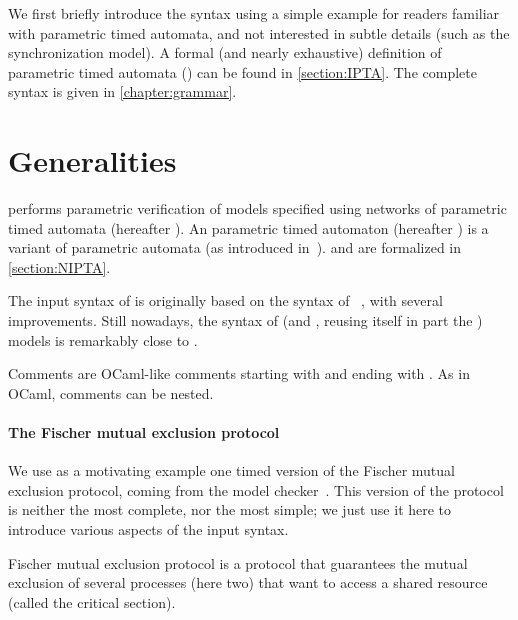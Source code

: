 We first briefly introduce the syntax using a simple example for readers familiar with parametric timed automata, and not interested in subtle details (such as the synchronization model).
A formal (and nearly exhaustive) definition of \imitator{} parametric timed automata (\NIPTA{}) can be found in \cref{section:IPTA}.
The complete syntax is given in \cref{chapter:grammar}.

\section{Generalities}
\imitator{} performs parametric verification of models specified using networks of \imitator{} parametric timed automata (hereafter \NIPTA{}).
An \imitator{} parametric timed automaton (hereafter \IPTA{}) is a variant of parametric automata (as introduced in~\cite{AHV93}).
\IPTA{} and \NIPTA{} are formalized in \cref{section:NIPTA}.

The input syntax of \imitator{} is originally based on the syntax of \hytech{}~\cite{HHW95}, with several improvements.
%
Still nowadays, the syntax of \hytech{} (and \phaverLite{}, reusing itself in part the \hytech{}) models is remarkably close to \imitator{}.

Comments are OCaml-like comments starting with \styleIMI{(*} and ending with \styleIMI{*)}.
As in OCaml, comments can be nested.


\paragraph{The Fischer mutual exclusion protocol}
We use as a motivating example one timed version of the Fischer mutual exclusion protocol, coming from the \pat{} model checker~\cite{SLDP09}.
This version of the protocol is neither the most complete, nor the most simple; we just use it here to introduce various aspects of the \imitator{} input syntax.

Fischer mutual exclusion protocol is a protocol that guarantees the mutual exclusion of several processes (here two) that want to access a shared resource (called the critical section).
%

